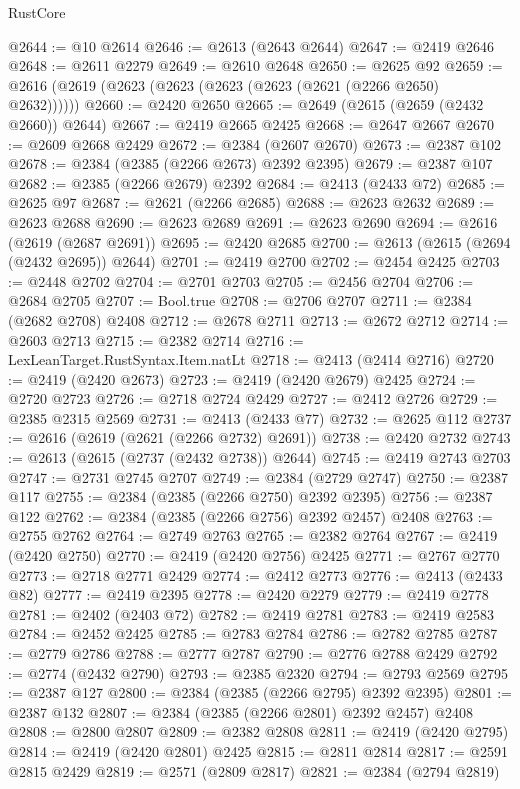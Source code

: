 \begin{lexlean}{RustCore}
\begin{coremodule}
@2644 := @10 @2614
@2646 := @2613 (@2643 @2644)
@2647 := @2419 @2646
@2648 := @2611 @2279
@2649 := @2610 @2648
@2650 := @2625 @92
@2659 := @2616 (@2619 (@2623 (@2623 (@2623 (@2623 (@2621 (@2266 @2650) @2632))))))
@2660 := @2420 @2650
@2665 := @2649 (@2615 (@2659 (@2432 @2660)) @2644)
@2667 := @2419 @2665 @2425
@2668 := @2647 @2667
@2670 := @2609 @2668 @2429
@2672 := @2384 (@2607 @2670)
@2673 := @2387 @102
@2678 := @2384 (@2385 (@2266 @2673) @2392 @2395)
@2679 := @2387 @107
@2682 := @2385 (@2266 @2679) @2392
@2684 := @2413 (@2433 @72)
@2685 := @2625 @97
@2687 := @2621 (@2266 @2685)
@2688 := @2623 @2632
@2689 := @2623 @2688
@2690 := @2623 @2689
@2691 := @2623 @2690
@2694 := @2616 (@2619 (@2687 @2691))
@2695 := @2420 @2685
@2700 := @2613 (@2615 (@2694 (@2432 @2695)) @2644)
@2701 := @2419 @2700
@2702 := @2454 @2425
@2703 := @2448 @2702
@2704 := @2701 @2703
@2705 := @2456 @2704
@2706 := @2684 @2705
@2707 := Bool.true
@2708 := @2706 @2707
@2711 := @2384 (@2682 @2708) @2408
@2712 := @2678 @2711
@2713 := @2672 @2712
@2714 := @2603 @2713
@2715 := @2382 @2714
@2716 := LexLeanTarget.RustSyntax.Item.natLt
@2718 := @2413 (@2414 @2716)
@2720 := @2419 (@2420 @2673)
@2723 := @2419 (@2420 @2679) @2425
@2724 := @2720 @2723
@2726 := @2718 @2724 @2429
@2727 := @2412 @2726
@2729 := @2385 @2315 @2569
@2731 := @2413 (@2433 @77)
@2732 := @2625 @112
@2737 := @2616 (@2619 (@2621 (@2266 @2732) @2691))
@2738 := @2420 @2732
@2743 := @2613 (@2615 (@2737 (@2432 @2738)) @2644)
@2745 := @2419 @2743 @2703
@2747 := @2731 @2745 @2707
@2749 := @2384 (@2729 @2747)
@2750 := @2387 @117
@2755 := @2384 (@2385 (@2266 @2750) @2392 @2395)
@2756 := @2387 @122
@2762 := @2384 (@2385 (@2266 @2756) @2392 @2457) @2408
@2763 := @2755 @2762
@2764 := @2749 @2763
@2765 := @2382 @2764
@2767 := @2419 (@2420 @2750)
@2770 := @2419 (@2420 @2756) @2425
@2771 := @2767 @2770
@2773 := @2718 @2771 @2429
@2774 := @2412 @2773
@2776 := @2413 (@2433 @82)
@2777 := @2419 @2395
@2778 := @2420 @2279
@2779 := @2419 @2778
@2781 := @2402 (@2403 @72)
@2782 := @2419 @2781
@2783 := @2419 @2583
@2784 := @2452 @2425
@2785 := @2783 @2784
@2786 := @2782 @2785
@2787 := @2779 @2786
@2788 := @2777 @2787
@2790 := @2776 @2788 @2429
@2792 := @2774 (@2432 @2790)
@2793 := @2385 @2320
@2794 := @2793 @2569
@2795 := @2387 @127
@2800 := @2384 (@2385 (@2266 @2795) @2392 @2395)
@2801 := @2387 @132
@2807 := @2384 (@2385 (@2266 @2801) @2392 @2457) @2408
@2808 := @2800 @2807
@2809 := @2382 @2808
@2811 := @2419 (@2420 @2795)
@2814 := @2419 (@2420 @2801) @2425
@2815 := @2811 @2814
@2817 := @2591 @2815 @2429
@2819 := @2571 (@2809 @2817)
@2821 := @2384 (@2794 @2819)

\end{coremodule}
\end{lexlean}
